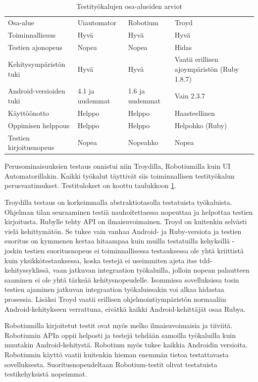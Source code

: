 \begin{table}[h]
\centering
\begin{tabular}{ p{} p{} p{} p{} }
  Osa-alue & Uiautomator & Robotium & Troyd \\
  Toiminnallisuus & Hyvä & Hyvä & Hyvä \\
  Testien ajonopeus & Nopea & Nopea & Hidas \\
  Kehitysympäristön tuki & Hyvä & Hyvä & Vaatii erillisen ajoympäristön (Ruby 1.8.7) \\
  Android-versioiden tuki & 4.1 ja uudemmat & 1.6 ja uudemmat & Vain 2.3.7 \\
  Käyttöönotto & Helppo & Helppo & Haasteellinen \\
  Oppimisen helppous & Helppo & Helppo & Helpohko (Ruby) \\
  Testien kirjoitusnopeus & Nopea & Nopeahko & Nopea \\
\end{tabular}
\caption{Testityökalujen osa-alueiden arviot}
\label{functionaltest_evaluation}
\end{table}

Perusominaisuuksien testaus onnistui niin Troydilla, Robotiumilla kuin UI Automatorillakin. Kaikki työkalut täyttivät siis toiminnallisen testityökalun perusvaatimukset. Testitulokset on koottu taulukkoon \ref{functionaltest_evaluation}.

Troydilla testaus on korkeimmalla abstraktiotasolla testatuista työkaluista. Ohjelman tilan seuraaminen testiä nauhoitettaessa nopeuttaa ja helpottaa testien kirjoitusta. Rubylle tehty API on ilmaisuvoimainen. Troyd on kuitenkin selvästi vielä kehittymätön. Se tukee vain vanhaa Android- ja Ruby-versiota ja testien suoritus on kymmenen kertaa hitaampaa kuin muilla testatuilla kehyksillä - joskin testien suoritusnopeus ei toiminnallisessa testauksessa ole yhtä kriittistä kuin yksikkötestauksessa, koska testejä ei useimmiten ajeta itse tdd-kehityssyklissä, vaan jatkuvan integraation työkaluilla, jolloin nopean palautteen saaminen ei ole yhtä tärkeää kehitysnopeudelle. Isommissa sovelluksissa tosin testien ajaminen jatkuvan integraation työkaluissakin voi alkaa hidastaa prosessia. Lisäksi Troyd vaatii erillisen ohjelmointiympäristön normaaliin Android-kehitykseen verrattuna, eivätkä kaikki Android-kehittäjät osaa Rubya.

Robotiumilla kirjoitetut testit ovat myös melko ilmaisuvoimaisia ja tiiviitä. Robotiumin APIn oppii helposti ja testejä tehdään samoilla työkaluilla kuin muutakin Android-kehitystä. Robotium myös tukee kaikkia Androidin versioita. Robotiumin käyttö vaatii kuitenkin hieman enemmän tietoa testattavasta sovelluksesta. Suoritusnopeudeltaan Robotium-testit olivat testatuista testikehyksistä nopeimmat.

